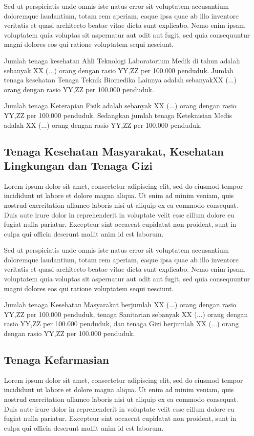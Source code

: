 Sed ut perspiciatis unde omnis iste natus error sit voluptatem accusantium doloremque laudantium, totam rem aperiam, eaque ipsa quae ab illo inventore veritatis et quasi architecto beatae vitae dicta sunt explicabo. Nemo enim ipsam voluptatem quia voluptas sit aspernatur aut odit aut fugit, sed quia consequuntur magni dolores eos qui ratione voluptatem sequi nesciunt.

Jumlah tenaga kesehatan Ahli Teknologi Laboratorium Medik di \namaKabupaten tahun
\tP adalah sebanyak XX (...) orang dengan rasio YY,ZZ per 100.000
penduduk. Jumlah tenaga kesehatan Tenaga Teknik Biomedika Lainnya adalah sebanyakXX (...) orang dengan rasio YY,ZZ per 100.000
penduduk.

Jumlah tenaga Keterapian Fisik adalah sebanyak XX (...) orang dengan rasio YY,ZZ per 100.000
penduduk. Sedangkan jumlah tenaga Keteknisian Medis adalah XX (...) orang dengan rasio YY,ZZ per 100.000
penduduk.

\subsection{Tenaga Kesehatan Masyarakat, Kesehatan Lingkungan dan Tenaga Gizi}
Lorem ipsum dolor sit amet, consectetur adipiscing elit, sed do eiusmod tempor incididunt ut labore et dolore magna aliqua. Ut enim ad minim veniam, quis nostrud exercitation ullamco laboris nisi ut aliquip ex ea commodo consequat. Duis aute irure dolor in reprehenderit in voluptate velit esse cillum dolore eu fugiat nulla pariatur. Excepteur sint occaecat cupidatat non proident, sunt in culpa qui officia deserunt mollit anim id est laborum.

Sed ut perspiciatis unde omnis iste natus error sit voluptatem accusantium doloremque laudantium, totam rem aperiam, eaque ipsa quae ab illo inventore veritatis et quasi architecto beatae vitae dicta sunt explicabo. Nemo enim ipsam voluptatem quia voluptas sit aspernatur aut odit aut fugit, sed quia consequuntur magni dolores eos qui ratione voluptatem sequi nesciunt. 

Jumlah tenaga Kesehatan Masyarakat berjumlah XX (...) orang dengan rasio YY,ZZ per 100.000 penduduk, tenaga Sanitarian sebanyak XX (...) orang dengan rasio YY,ZZ per 100.000 penduduk, dan tenaga Gizi berjumlah XX (...) orang dengan rasio YY,ZZ per 100.000 penduduk.

\subsection{Tenaga Kefarmasian}
Lorem ipsum dolor sit amet, consectetur adipiscing elit, sed do eiusmod tempor incididunt ut labore et dolore magna aliqua. Ut enim ad minim veniam, quis nostrud exercitation ullamco laboris nisi ut aliquip ex ea commodo consequat. Duis aute irure dolor in reprehenderit in voluptate velit esse cillum dolore eu fugiat nulla pariatur. Excepteur sint occaecat cupidatat non proident, sunt in culpa qui officia deserunt mollit anim id est laborum.


